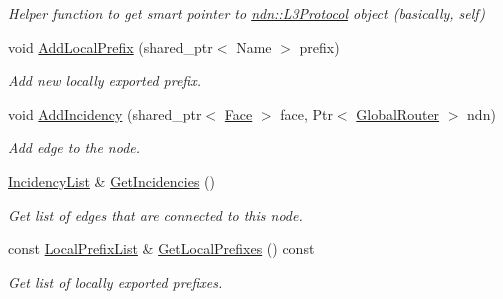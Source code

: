 \begin{DoxyCompactItemize}
\begin{DoxyCompactList}\small\item\em Helper function to get smart pointer to \hyperlink{classns3_1_1ndn_1_1L3Protocol}{ndn\+::\+L3\+Protocol} object (basically, self) \end{DoxyCompactList}\item 
void \hyperlink{classns3_1_1ndn_1_1GlobalRouter_afe4f8a6580f4bf9e9b3ab2b7a443f5c3}{Add\+Local\+Prefix} (shared\+\_\+ptr$<$ Name $>$ prefix)
\begin{DoxyCompactList}\small\item\em Add new locally exported prefix. \end{DoxyCompactList}\item 
void \hyperlink{classns3_1_1ndn_1_1GlobalRouter_a3e438e17fae9b59dce350dc32bd47af3}{Add\+Incidency} (shared\+\_\+ptr$<$ \hyperlink{classnfd_1_1Face}{Face} $>$ face, Ptr$<$ \hyperlink{classns3_1_1ndn_1_1GlobalRouter}{Global\+Router} $>$ ndn)
\begin{DoxyCompactList}\small\item\em Add edge to the node. \end{DoxyCompactList}\item 
\hyperlink{classns3_1_1ndn_1_1GlobalRouter_a48a657a3cc734401b488ace8b6cd2ddb}{Incidency\+List} \& \hyperlink{classns3_1_1ndn_1_1GlobalRouter_a587b709038705efe2a13855a528e2920}{Get\+Incidencies} ()\hypertarget{classns3_1_1ndn_1_1GlobalRouter_a587b709038705efe2a13855a528e2920}{}\label{classns3_1_1ndn_1_1GlobalRouter_a587b709038705efe2a13855a528e2920}

\begin{DoxyCompactList}\small\item\em Get list of edges that are connected to this node. \end{DoxyCompactList}\item 
const \hyperlink{classns3_1_1ndn_1_1GlobalRouter_a06c10324453a7a931a105fba937ba9b8}{Local\+Prefix\+List} \& \hyperlink{classns3_1_1ndn_1_1GlobalRouter_ad9a7a7b6d6076c3506e7c91291141f9a}{Get\+Local\+Prefixes} () const\hypertarget{classns3_1_1ndn_1_1GlobalRouter_ad9a7a7b6d6076c3506e7c91291141f9a}{}\label{classns3_1_1ndn_1_1GlobalRouter_ad9a7a7b6d6076c3506e7c91291141f9a}

\begin{DoxyCompactList}\small\item\em Get list of locally exported prefixes. \end{DoxyCompactList}\end{DoxyCompactItemize}
